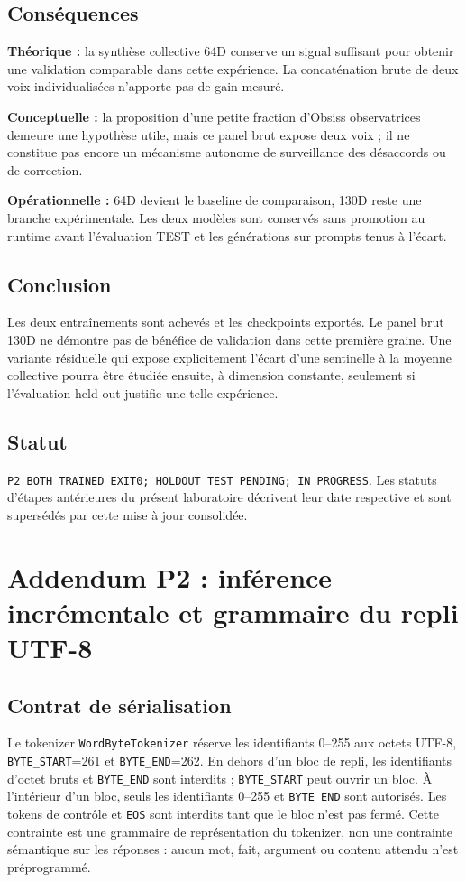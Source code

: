 \documentclass[11pt,a4paper]{report}
\begin{document}
\section{Conséquences}
\textbf{Théorique :} la synthèse collective 64D conserve un signal suffisant pour obtenir une validation comparable dans cette expérience. La concaténation brute de deux voix individualisées n'apporte pas de gain mesuré.\par
\textbf{Conceptuelle :} la proposition d'une petite fraction d'Obsiss observatrices demeure une hypothèse utile, mais ce panel brut expose deux voix ; il ne constitue pas encore un mécanisme autonome de surveillance des désaccords ou de correction.\par
\textbf{Opérationnelle :} 64D devient le baseline de comparaison, 130D reste une branche expérimentale. Les deux modèles sont conservés sans promotion au runtime avant l'évaluation TEST et les générations sur prompts tenus à l'écart.
\section{Conclusion}
Les deux entraînements sont achevés et les checkpoints exportés. Le panel brut 130D ne démontre pas de bénéfice de validation dans cette première graine. Une variante résiduelle qui expose explicitement l'écart d'une sentinelle à la moyenne collective pourra être étudiée ensuite, à dimension constante, seulement si l'évaluation held-out justifie une telle expérience.
\section{Statut}
\texttt{P2\_BOTH\_TRAINED\_EXIT0; HOLDOUT\_TEST\_PENDING; IN\_PROGRESS}. Les statuts d'étapes antérieures du présent laboratoire décrivent leur date respective et sont supersédés par cette mise à jour consolidée.

\chapter{Addendum P2 : inférence incrémentale et grammaire du repli UTF-8}
\label{chap:p2-incremental-byte-grammar}

\section{Contrat de sérialisation}
\begin{sloppypar}Le tokenizer \texttt{WordByteTokenizer} réserve les identifiants 0--255 aux octets UTF-8, \texttt{BYTE\_START}=261 et \texttt{BYTE\_END}=262. En dehors d'un bloc de repli, les identifiants d'octet bruts et \texttt{BYTE\_END} sont interdits ; \texttt{BYTE\_START} peut ouvrir un bloc. À l'intérieur d'un bloc, seuls les identifiants 0--255 et \texttt{BYTE\_END} sont autorisés. Les tokens de contrôle et \texttt{EOS} sont interdits tant que le bloc n'est pas fermé. Cette contrainte est une grammaire de représentation du tokenizer, non une contrainte sémantique sur les réponses : aucun mot, fait, argument ou contenu attendu n'est préprogrammé.\end{sloppypar}
\end{document}
